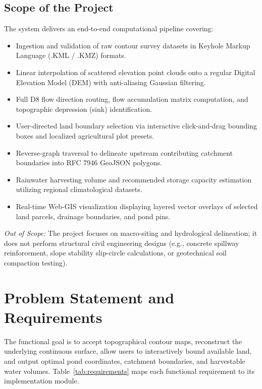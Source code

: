 \documentclass[manuscript,screen]{acmart}
\begin{document}
\subsection{Scope of the Project}
The system delivers an end-to-end computational pipeline covering:
\begin{itemize}
    \item Ingestion and validation of raw contour survey datasets in Keyhole Markup Language (.KML / .KMZ) formats.
    \item Linear interpolation of scattered elevation point clouds onto a regular Digital Elevation Model (DEM) with anti-aliasing Gaussian filtering.
    \item Full D8 flow direction routing, flow accumulation matrix computation, and topographic depression (sink) identification.
    \item User-directed land boundary selection via interactive click-and-drag bounding boxes and localized agricultural plot presets.
    \item Reverse-graph traversal to delineate upstream contributing catchment boundaries into RFC 7946 GeoJSON polygons.
    \item Rainwater harvesting volume and recommended storage capacity estimation utilizing regional climatological datasets.
    \item Real-time Web-GIS visualization displaying layered vector overlays of selected land parcels, drainage boundaries, and pond pins.
\end{itemize}
\emph{Out of Scope:} The project focuses on macro-siting and hydrological delineation; it does not perform structural civil engineering designs (e.g., concrete spillway reinforcement, slope stability slip-circle calculations, or geotechnical soil compaction testing).

\section{Problem Statement and Requirements}
\label{sec:requirements}
The functional goal is to accept topographical contour maps, reconstruct the underlying continuous surface, allow users to interactively bound available land, and output optimal pond coordinates, catchment boundaries, and harvestable water volumes. Table~\ref{tab:requirements} maps each functional requirement to its implementation module.
\end{document}
